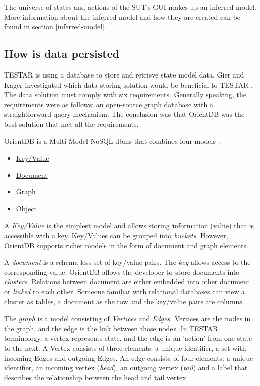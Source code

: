 The universe of states and actions of the SUT's GUI makes up an inferred model. More information about the inferred model and how they are created can be found in section \ref{inferred-model}.

\subsection{How is data persisted}

TESTAR is using a database to store and retrieve state model data. Gier and Kager investigated which data storing solution would be beneficial to TESTAR \cite{GierKager}. The data solution must comply with six requirements. Generally speaking, the requirements were as follows: an open-source graph database with a straightforward query mechanism. The conclusion was that OrientDB was the best solution that met all the requirements.

\begin{samepage}
OrientDB is a Multi-Model NoSQL \acrfull{dbms} that combines four models \cite{orientDbModeling}:

\begin{itemize}
    \item \hyperlink{db:key-value}{Key/Value}
    \item \hyperlink{db:document}{Document}
    \item \hyperlink{db:graph}{Graph}
    \item \hyperlink{db:object}{Object}
\end{itemize}
\end{samepage}

A \hypertarget{db:key-value}{\emph{Key/Value}} is the simplest model and allows storing information (value) that is accessible with a key. Key/Values can be grouped into \textit{buckets}. However, OrientDB supports richer models in the form of document and graph elements.

A \hypertarget{db:document}{\emph{document}} is a schema-less set of key/value pairs. The \emph{key} allows access to the corresponding value. OrientDB allows the developer to store documents into \emph{clusters}. Relations between document are either embedded into other document or \emph{linked} to each other. Someone familiar with relational databases can view a cluster as tables, a document as the row and the key/value pairs are columns.

The \hypertarget{db:graph}{\emph{graph}} is a model consisting of \emph{Vertices} and \emph{Edges}. Vertices are the nodes in the graph, and the edge is the link between those nodes. In TESTAR terminology, a vertex represents state, and the edge is an 'action' from one state to the next. A Vertex consists of three elements: a unique identifier, a set with incoming Edges and outgoing Edges. An edge consists of four elements: a unique identifier, an incoming vertex (\emph{head}), an outgoing vertex (\emph{tail}) and a label that describes the relationship between the head and tail vertex.\par

